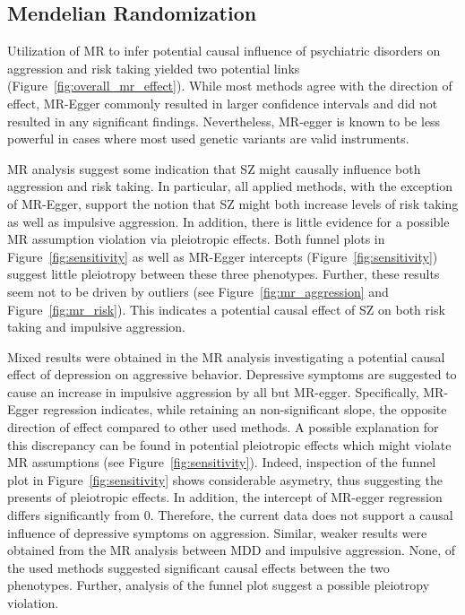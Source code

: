 \subsection{Mendelian Randomization}
\label{sub:mendelian_randomization}

Utilization of MR to infer potential causal influence of psychiatric disorders on aggression and risk taking yielded two potential links (Figure~\ref{fig:overall_mr_effect}).
While most methods agree with the direction of effect, MR-Egger commonly resulted in larger confidence intervals and did not resulted in any significant findings.
Nevertheless, MR-egger is known to be less powerful in cases where most used genetic variants are valid instruments.

MR analysis suggest some indication that SZ might causally influence both aggression and risk taking.
In particular, all applied methods, with the exception of MR-Egger, support the notion that SZ might both increase levels of risk taking as well as impulsive aggression.
In addition, there is little evidence for a possible MR assumption violation via pleiotropic effects.
Both funnel plots in Figure~\ref{fig:sensitivity} as well as MR-Egger intercepts (Figure~\ref{fig:sensitivity}) suggest little pleiotropy between these three phenotypes.
Further, these results seem not to be driven by outliers (see Figure~\ref{fig:mr_aggression} and Figure~\ref{fig:mr_risk}).
This indicates a potential causal effect of SZ on both risk taking and impulsive aggression.

Mixed results were obtained in the MR analysis investigating a potential causal effect of depression on aggressive behavior.
Depressive symptoms are suggested to cause an increase in impulsive aggression by all but MR-egger.
Specifically, MR-Egger regression indicates, while retaining an non-significant slope, the opposite direction of effect compared to other used methods.  
A possible explanation for this discrepancy can be found in potential pleiotropic effects which might violate MR assumptions (see Figure~\ref{fig:sensitivity}).
Indeed, inspection of the funnel plot in Figure~\ref{fig:sensitivity} shows considerable asymetry, thus suggesting the presents of pleiotropic effects.
In addition, the intercept of MR-egger regression differs significantly from $0$.
Therefore, the current data does not support a causal influence of depressive symptoms on aggression. 
Similar, weaker results were obtained from the MR analysis between MDD and impulsive aggression.
None, of the used methods suggested significant causal effects between the two phenotypes. 
Further, analysis of the funnel plot suggest a possible pleiotropy violation.

